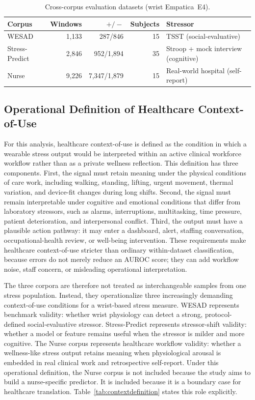 \documentclass[healthcare,article,submit,moreauthors,pdftex]{Definitions/mdpi}
\begin{document}
\begin{table}[H]
\centering
\caption{Cross-corpus evaluation datasets (wrist Empatica~E4).\label{tab:corpora}}
\begin{tabular}{lrrrl}
\toprule
\textbf{Corpus} & \textbf{Windows} & \textbf{$+/-$} & \textbf{Subjects} & \textbf{Stressor} \\
\midrule
WESAD          & 1{,}133 & 287/846        & 15 & TSST (social-evaluative) \\
Stress-Predict & 2{,}846 & 952/1{,}894    & 35 & Stroop + mock interview (cognitive) \\
Nurse          & 9{,}226 & 7{,}347/1{,}879 & 15 & Real-world hospital (self-report) \\
\bottomrule
\end{tabular}
\end{table}

\subsection{Operational Definition of Healthcare Context-of-Use}

For this analysis, healthcare context-of-use is defined as the condition in
which a wearable stress output would be interpreted within an active clinical
workforce workflow rather than as a private wellness reflection. This definition
has three components. First, the signal must retain meaning under the physical
conditions of care work, including walking, standing, lifting, urgent movement,
thermal variation, and device-fit changes during long shifts. Second, the signal
must remain interpretable under cognitive and emotional conditions that differ
from laboratory stressors, such as alarms, interruptions, multitasking, time
pressure, patient deterioration, and interpersonal conflict. Third, the output
must have a plausible action pathway: it may enter a dashboard, alert, staffing
conversation, occupational-health review, or well-being intervention. These
requirements make healthcare context-of-use stricter than ordinary
within-dataset classification, because errors do not merely reduce an AUROC
score; they can add workflow noise, staff concern, or misleading operational
interpretation.

The three corpora are therefore not treated as interchangeable samples from one
stress population. Instead, they operationalize three increasingly demanding
context-of-use conditions for a wrist-based stress measure. WESAD represents
benchmark validity: whether wrist physiology can detect a strong,
protocol-defined social-evaluative stressor. Stress-Predict represents
stressor-shift validity: whether a model or feature remains useful when the
stressor is milder and more cognitive. The Nurse corpus represents healthcare
workflow validity: whether a wellness-like stress output retains meaning when
physiological arousal is embedded in real clinical work and retrospective
self-report. Under this operational definition, the Nurse corpus is not included
because the study aims to build a nurse-specific predictor. It is included
because it is a boundary case for healthcare translation. Table~\ref{tab:contextdefinition}
states this role explicitly.
\end{document}
